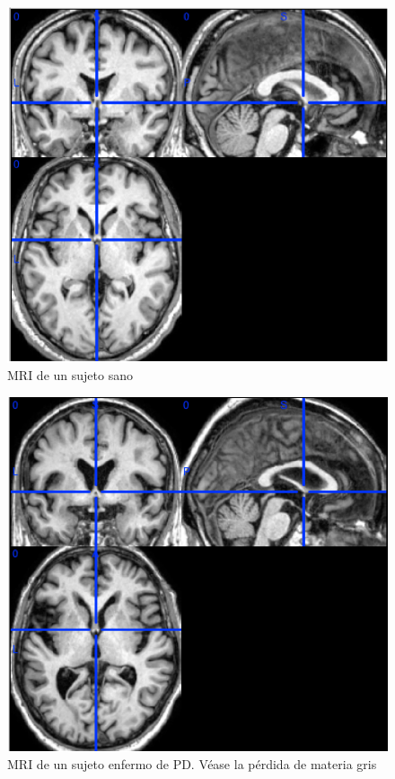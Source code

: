\begin{figure}[H] %
	\centering
	\includegraphics[scale=0.35]{healthy.png}  %
	\caption{MRI de un sujeto sano} 
	\label{fig:healthy}
\end{figure}

\begin{figure}[H] %
	\centering
	\includegraphics[scale=0.34]{unhealthy.png}  %
	\caption{MRI de un sujeto enfermo de PD. Véase la pérdida de materia gris} 
	\label{fig:unhealthy}
\end{figure}

